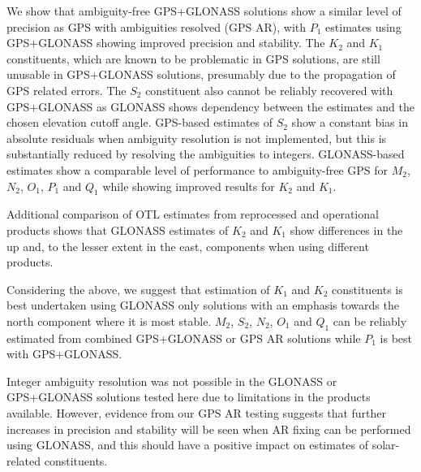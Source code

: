 \documentclass[se, manuscript]{copernicus}
\providecommand{\DIFadd}[1]{{\protect\color{blue}\uwave{#1}}} %
\providecommand{\DIFaddbegin}{} %
\providecommand{\DIFaddend}{} %
\providecommand{\DIFdelend}{} %
\begin{document}
\DIFdelend \DIFaddbegin \DIFadd{and components. }\DIFaddend We show that ambiguity-free GPS+GLONASS solutions show a similar level of precision as GPS with ambiguities resolved (GPS AR), with $P_1$ estimates using GPS+GLONASS showing improved precision and stability. The $K_2$ and $K_1$ constituents, which are known to be problematic in GPS solutions, are still unusable in GPS+GLONASS solutions, presumably due to the propagation of GPS related errors. The $S_2$ constituent also cannot be reliably recovered with GPS+GLONASS as GLONASS shows dependency between the estimates and the chosen elevation cutoff angle. GPS-based estimates of $S_2$ show a constant bias in absolute residuals when ambiguity resolution is not implemented, but this is substantially reduced by resolving the ambiguities to integers. GLONASS-based estimates show a comparable level of performance to ambiguity-free GPS for $M_2$, $N_2$, $O_1$, $P_1$ and $Q_1$ while showing improved results for $K_2$ and $K_1$.

Additional comparison of OTL estimates from reprocessed and operational products shows that GLONASS estimates of $K_2$ and $K_1$ show differences in the up and, to the lesser extent in the east, components when using different products.

Considering the above, we suggest that estimation of $K_1$ and $K_2$ constituents is best undertaken using GLONASS only solutions with an emphasis towards the north component where it is most stable. $M_2$, $S_2$, $N_2$, $O_1$ and $Q_1$ can be reliably estimated from combined GPS+GLONASS or GPS AR solutions while $P_1$ is best with GPS+GLONASS.

Integer ambiguity resolution was not possible in the GLONASS or GPS+GLONASS solutions tested here due to limitations in the products available. However, evidence from our GPS AR testing suggests that further increases in precision and stability will be seen when AR fixing can be performed using GLONASS, and this should have a positive impact on estimates of solar-related constituents.



\end{document}

